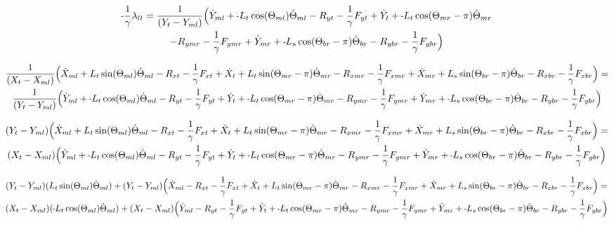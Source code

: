 \documentclass[11pt, landscape]{article}
\newcommand{\mn}{\scalebox{0.7}[1.0]{-}}
\begin{document}
\begin{multline}
\mn\frac{1}{\gamma}\lambda_{lt} =
\frac{1}{(Y_{t } - Y_{ml})} \Big( \dot{Y}_{ml} + \mn L_{t}\cos(\Theta_{ml})      \dot{\Theta}_{ml} - R_{yt} - \frac{1}{\gamma}F_{yt } + \dot{Y}_{t } + \mn L_{t}\cos(\Theta_{mr}-\pi)  \dot{\Theta}_{mr} \\
- R_{ymr} - \frac{1}{\gamma}F_{ymr} + \dot{Y}_{mr} + \mn L_{s}\cos(\Theta_{br}-\pi)  \dot{\Theta}_{br} - R_{ybr} - \frac{1}{\gamma}F_{ybr}\Big)
\end{multline}

\begin{multline}
\frac{1}{(X_{t } - X_{ml})} \Big( \dot{X}_{ml} + L_{t}\sin(\Theta_{ml})      \dot{\Theta}_{ml} - R_{xt } - \frac{1}{\gamma}F_{xt } + \dot{X}_{t } + L_{t}\sin(\Theta_{mr}-\pi)  \dot{\Theta}_{mr}
- R_{xmr} - \frac{1}{\gamma}F_{xmr} + \dot{X}_{mr} + L_{s}\sin(\Theta_{br}-\pi)  \dot{\Theta}_{br} - R_{xbr} - \frac{1}{\gamma}F_{xbr} \Big) = \\
\frac{1}{(Y_{t } - Y_{ml})} \Big( \dot{Y}_{ml} + \mn L_{t}\cos(\Theta_{ml})      \dot{\Theta}_{ml} - R_{yt} - \frac{1}{\gamma}F_{yt } + \dot{Y}_{t } + \mn L_{t}\cos(\Theta_{mr}-\pi)  \dot{\Theta}_{mr}
- R_{ymr} - \frac{1}{\gamma}F_{ymr} + \dot{Y}_{mr} + \mn L_{s}\cos(\Theta_{br}-\pi)  \dot{\Theta}_{br} - R_{ybr} - \frac{1}{\gamma}F_{ybr}\Big)
\end{multline}

\begin{multline}
(Y_{t } - Y_{ml}) \Big( \dot{X}_{ml} + L_{t}\sin(\Theta_{ml}) \dot{\Theta}_{ml} - R_{xt } - \frac{1}{\gamma}F_{xt } + \dot{X}_{t } + L_{t}\sin(\Theta_{mr}-\pi)  \dot{\Theta}_{mr}
- R_{xmr} - \frac{1}{\gamma}F_{xmr} + \dot{X}_{mr} + L_{s}\sin(\Theta_{br}-\pi)  \dot{\Theta}_{br} - R_{xbr} - \frac{1}{\gamma}F_{xbr} \Big) = \\
(X_{t } - X_{ml}) \Big( \dot{Y}_{ml} + \mn L_{t}\cos(\Theta_{ml}) \dot{\Theta}_{ml} - R_{yt} - \frac{1}{\gamma}F_{yt } + \dot{Y}_{t } + \mn L_{t}\cos(\Theta_{mr}-\pi)  \dot{\Theta}_{mr}
- R_{ymr} - \frac{1}{\gamma}F_{ymr} + \dot{Y}_{mr} + \mn L_{s}\cos(\Theta_{br}-\pi)  \dot{\Theta}_{br} - R_{ybr} - \frac{1}{\gamma}F_{ybr}\Big)
\end{multline}

\begin{multline}
(Y_{t } - Y_{ml})(L_{t}\sin(\Theta_{ml}) \dot{\Theta}_{ml}) + (Y_{t } - Y_{ml})\Big( \dot{X}_{ml} - R_{xt } - \frac{1}{\gamma}F_{xt } + \dot{X}_{t } + L_{t}\sin(\Theta_{mr}-\pi)  \dot{\Theta}_{mr}
- R_{xmr} - \frac{1}{\gamma}F_{xmr} + \dot{X}_{mr} + L_{s}\sin(\Theta_{br}-\pi)  \dot{\Theta}_{br} - R_{xbr} - \frac{1}{\gamma}F_{xbr} \Big) = \\
(X_{t } - X_{ml})(\mn L_{t}\cos(\Theta_{ml}) \dot{\Theta}_{ml}) + (X_{t } - X_{ml}) \Big( \dot{Y}_{ml} - R_{yt} - \frac{1}{\gamma}F_{yt } + \dot{Y}_{t } + \mn L_{t}\cos(\Theta_{mr}-\pi)  \dot{\Theta}_{mr}
- R_{ymr} - \frac{1}{\gamma}F_{ymr} + \dot{Y}_{mr} + \mn L_{s}\cos(\Theta_{br}-\pi)  \dot{\Theta}_{br} - R_{ybr} - \frac{1}{\gamma}F_{ybr}\Big)
\end{multline}
\end{document}
